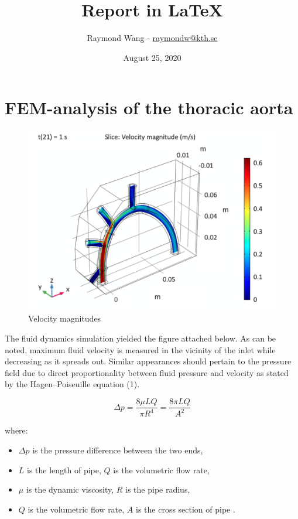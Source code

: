 \documentclass[12pt]{article}
\title{Report in \LaTeX}
\date{August 25, 2020}
\author{Raymond Wang - 
\url{raymondw@kth.se}}
\begin{document}
\maketitle
\tableofcontents

\newpage 
\section{FEM-analysis of the thoracic aorta}

\begin{figure}
\centering
\includegraphics[width=.98\linewidth]{velocity}
\caption{Velocity magnitudes}
\end{figure}

The fluid dynamics simulation yielded the figure attached below. 
As can be noted, maximum fluid velocity is measured in the vicinity of the inlet 
while decreasing as it spreads out. Similar appearances should pertain to 
the pressure field due to direct proportionality between fluid pressure 
and velocity as stated by the Hagen–Poiseuille equation (1).

\begin{equation}
    \Delta p = \frac{8\mu LQ}{\pi R^{4}} = \frac{8 \pi LQ}{A^{2}}
\end{equation}

\noindent where: 
\begin{itemize}
    \item[] $\Delta p$ is the pressure difference between the two ends,
    \item[] $L$ is the length of pipe, \hspace{0.2cm} $Q$  is the volumetric flow rate,
    \item[] $\mu$ is the dynamic viscosity,
    $R$ is the pipe radius,
    \item[] $Q$  is the volumetric flow rate,
    $A$ is the cross section of pipe \cite{vogel2020life}.
\end{itemize}
\end{document}
